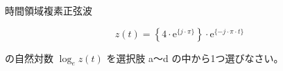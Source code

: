 \noindent 時間領域複素正弦波 

\[
z(t) = \left \{ 4 \cdot \textrm{e}^{\{ j \cdot \pi \}} \right \} \cdot \textrm{e}^{\{ -j \cdot \pi \cdot t \}}
\]

\bigskip
\noindent の自然対数 $\log_e z(t)$ を選択肢 a〜d の中から1つ選びなさい。
